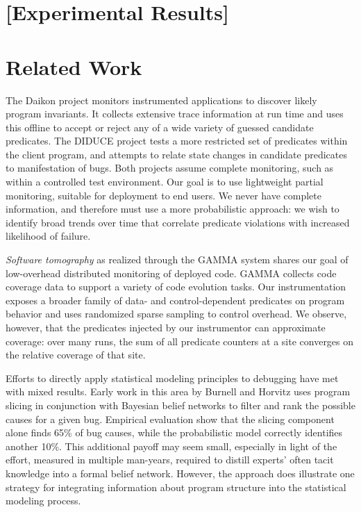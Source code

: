 \documentclass{sig-alternate}
\newcommand{\termdef}[1]{\textit{#1}}
\newcommand{\placeholder}[1]{{\color[cmyk]{0,0.61,0.87,0}[#1]}}
\begin{document}
\section{\placeholder{Experimental Results}}
\label{sec:experiments:results}


\section{Related Work}
\label{sec:related-work}

The Daikon project \cite{ernst2001} monitors instrumented applications
to discover likely program invariants.  It collects extensive trace
information at run time and uses this offline to accept or reject any
of a wide variety of guessed candidate predicates.  The DIDUCE project
\cite{ICSE02*291} tests a more restricted set of predicates within the
client program, and attempts to relate state changes in candidate
predicates to manifestation of bugs.  Both projects assume complete
monitoring, such as within a controlled test environment.  Our goal is
to use lightweight partial monitoring, suitable for deployment to end
users.  We never have complete information, and therefore must use a
more probabilistic approach: we wish to identify broad trends over
time that correlate predicate violations with increased likelihood of
failure.

\termdef{Software tomography} as realized through the GAMMA system
\cite{PASTE'02*2,Orso:2003:LFDIART} shares our goal of low-overhead
distributed monitoring of deployed code.  GAMMA collects code coverage
data to support a variety of code evolution tasks.  Our
instrumentation exposes a broader family of data- and
control-dependent predicates on program behavior and uses randomized
sparse sampling to control overhead.  We observe, however, that the
predicates injected by our instrumentor can approximate coverage: over
many runs, the sum of all predicate counters at a site converges on
the relative coverage of that site.

Efforts to directly apply statistical modeling principles to debugging
have met with mixed results.  Early work in this area by Burnell and
Horvitz \cite{Burnell:1995:SCM} uses program slicing in conjunction
with Bayesian belief networks to filter and rank the possible causes
for a given bug.  Empirical evaluation show that the slicing component
alone finds 65\% of bug causes, while the probabilistic model
correctly identifies another 10\%.  This additional payoff may seem
small, especially in light of the effort, measured in multiple
man-years, required to distill experts' often tacit knowledge into a
formal belief network.  However, the approach does illustrate one
strategy for integrating information about program structure into the
statistical modeling process.
\end{document}
